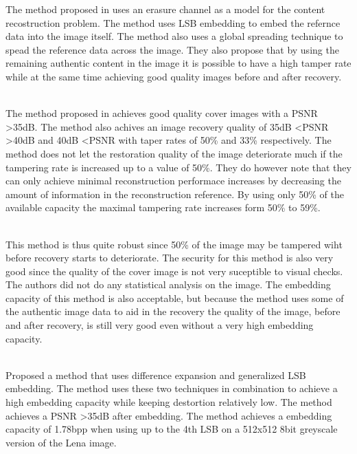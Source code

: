 \documentclass[a4paper]{article}
\begin{document}
The method proposed in \cite {korus2013efficient} uses an erasure channel as a model for the content recostruction problem.
The method uses LSB embedding to embed the refernce data into the image itself.
The method also uses a global spreading technique to spead the reference data across the image.
They also propose that by using the remaining authentic content in the image it is possible to have a high tamper rate while at the same time achieving good quality images before and after recovery.

\hspace{0pt} \\
The method proposed in \cite {korus2013efficient} achieves good quality cover images with a PSNR \textgreater 35dB. 
The method also achives an image recovery quality of 35dB \textless PSNR \textgreater 40dB and 40dB \textless PSNR with taper rates of 50\% and 33\% respectively.
The method does not let the restoration quality of the image deteriorate much if the tampering rate is increased up to a value of 50\%.
They do however note that they can only achieve minimal reconstruction performace increases by decreasing the amount of information in the reconstruction reference.
By using only 50\% of the available capacity the maximal tampering rate increases form 50\% to 59\%.

\hspace{0pt} \\
This method \cite {korus2013efficient} is thus quite robust since 50\% of the image may be tampered wiht before recovery starts to deteriorate.
The security for this method is also very good since the quality of the cover image is not very suceptible to visual checks.
The authors did not do any statistical analysis on the image.
The embedding capacity of this method is also acceptable, but because the method uses some of the authentic image data to aid in the recovery the quality of the image, before and after recovery, is still very good even without a very high embedding capacity.  

\hspace{0pt} \\
\cite {tian2003high} Proposed a method that uses difference expansion and generalized LSB embedding.
The method uses these two techniques in combination to achieve a high embedding capacity while keeping destortion relatively low.
The method achieves a PSNR \textgreater 35dB after embedding.
The method achieves a embedding capacity of 1.78bpp when using up to the 4th LSB on a 512x512 8bit greyscale version of the Lena image.
\end{document}
